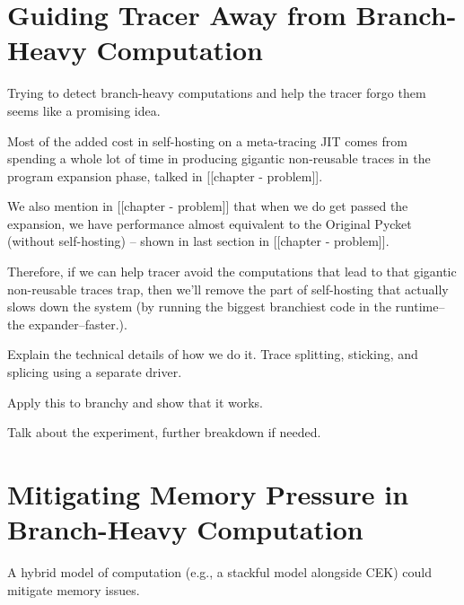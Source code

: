 	\section{Guiding Tracer Away from Branch-Heavy Computation}
		\begin{mainpoint}
			Trying to detect branch-heavy computations and help the tracer forgo them seems like a promising idea.
		\end{mainpoint}


    \begin{paragraph-here}
      Most of the added cost in self-hosting on a meta-tracing JIT comes from spending a whole lot of time in producing gigantic non-reusable traces in the program expansion phase, talked in [[chapter - problem]].
    \end{paragraph-here}

    \begin{paragraph-here}
      We also mention in [[chapter - problem]] that when we do get passed the expansion, we have performance almost equivalent to the Original Pycket (without self-hosting) -- shown in last section in [[chapter - problem]].
    \end{paragraph-here}

    \begin{paragraph-here}
      Therefore, if we can help tracer avoid the computations that lead to that gigantic non-reusable traces trap, then we'll remove the part of self-hosting that actually slows down the system (by running the biggest branchiest code in the runtime--the expander--faster.).
    \end{paragraph-here}

    \begin{paragraph-here}
      Explain the technical details of how we do it. Trace splitting, sticking, and splicing using a separate driver.
    \end{paragraph-here}

    \begin{show-experiment}
      Apply this to branchy and show that it works.
    \end{show-experiment}

    \begin{paragraph-here}
      Talk about the experiment, further breakdown if needed.
    \end{paragraph-here}

	\section{Mitigating Memory Pressure in Branch-Heavy Computation}
		\begin{mainpoint}
			A hybrid model of computation (e.g., a stackful model alongside CEK) could mitigate memory issues.
		\end{mainpoint}

